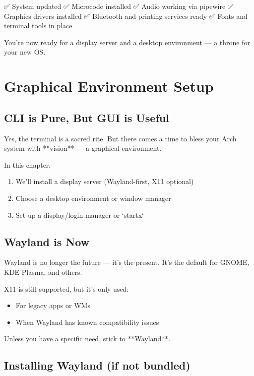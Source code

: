 \documentclass[12pt]{book}
\begin{document}
✅ System updated  
✅ Microcode installed  
✅ Audio working via pipewire  
✅ Graphics drivers installed  
✅ Bluetooth and printing services ready  
✅ Fonts and terminal tools in place  

You're now ready for a display server and a desktop environment — a throne for your new OS.

\clearpage


\chapter{Graphical Environment Setup}

\section*{CLI is Pure, But GUI is Useful}

Yes, the terminal is a sacred rite. But there comes a time to bless your Arch system with **vision** — a graphical environment.

In this chapter:

\begin{enumerate}
  \item We’ll install a display server (Wayland-first, X11 optional)
  \item Choose a desktop environment or window manager
  \item Set up a display/login manager or `startx`
\end{enumerate}

\section{Wayland is Now}

Wayland is no longer the future — it’s the present. It’s the default for GNOME, KDE Plasma, and others.

X11 is still supported, but it's only used:
\begin{itemize}
  \item For legacy apps or WMs
  \item When Wayland has known compatibility issues
\end{itemize}

Unless you have a specific need, stick to **Wayland**.

\section{Installing Wayland (if not bundled)}
\end{document}
